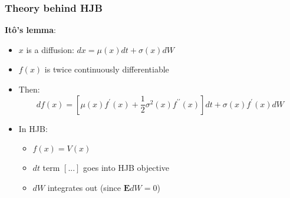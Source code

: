 \documentclass[bigger,handout]{beamer}
\begin{document}
\begin{frame}%
\frametitle{Theory behind HJB}

\textbf{It\^{o}'s lemma}:

\begin{itemize}
\item $x$ is a diffusion: $dx=\mu \left( x\right) dt+\sigma \left( x\right)
dW$

\item $f\left( x\right) $ is twice continuously differentiable

\item Then:%
\begin{equation*}
df\left( x\right) =\left[ \mu \left( x\right) f^{\prime }\left( x\right) +%
\frac{1}{2}\sigma ^{2}\left( x\right) f^{\prime \prime }\left( x\right) %
\right] dt+\sigma \left( x\right) f^{\prime }\left( x\right) dW
\end{equation*}

\item In HJB:

\begin{itemize}
\item $f\left( x\right) =V\left( x\right) $

\item $dt$ term $\left[ ...\right] $ goes into HJB objective

\item $dW$ integrates out (since $\mathbf{E}dW=0$)
\end{itemize}
\end{itemize}


\end{frame}%
\end{document}
